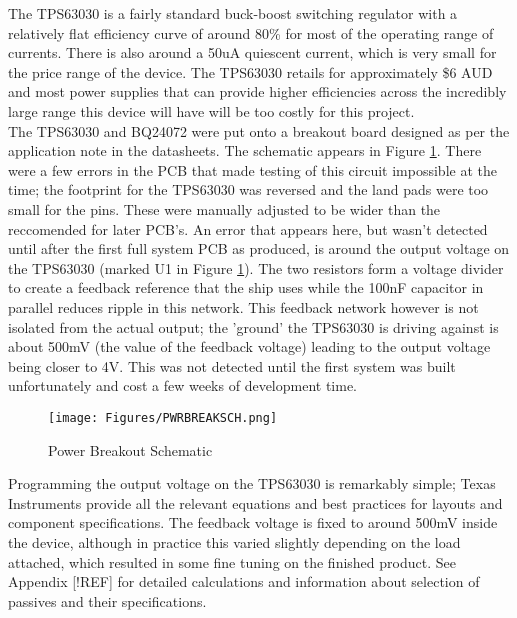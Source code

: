 \documentclass[12pt,openany,a4paper]{book}
\begin{document}
		The TPS63030 is a fairly standard buck-boost switching regulator with a relatively flat efficiency curve of around 80\% for most of the operating range of currents. There is also around a 50uA quiescent current, which is very small for the price range of the device. The TPS63030 retails for approximately \$6 AUD and most power supplies that can provide higher efficiencies across the incredibly large range this device will have will be too costly for this project. \\
		
		The TPS63030 and BQ24072 were put onto a breakout board designed as per the application note in the datasheets. The schematic appears in Figure \ref{fig:PWRBREAKSCH}. There were a few errors in the PCB that made testing of this circuit impossible at the time; the footprint for the TPS63030 was reversed and the land pads were too small for the pins. These were manually adjusted to be wider than the reccomended for later PCB's. An error that appears here, but wasn't detected until after the first full system PCB as produced, is around the output voltage on the TPS63030 (marked U1 in Figure \ref{fig:PWRBREAKSCH}). The two resistors form a voltage divider to create a feedback reference that the ship uses while the 100nF capacitor in parallel reduces ripple in this network. This feedback network however is not isolated from the actual output; the 'ground' the TPS63030 is driving against is about 500mV (the value of the feedback voltage) leading to the output voltage being closer to 4V. This was not detected until the first system was built unfortunately and cost a few weeks of development time. \\
		
		\begin{figure}[H]
			\centering
			\texttt{[image: Figures/PWRBREAKSCH.png]}
			\caption{Power Breakout Schematic}
			\label{fig:PWRBREAKSCH}
		\end{figure}	
		
		Programming the output voltage on the TPS63030 is remarkably simple; Texas Instruments provide all the relevant equations and best practices for layouts and component specifications. The feedback voltage is fixed to around 500mV inside the device, although in practice this varied slightly depending on the load attached, which resulted in some fine tuning on the finished product. See Appendix [!REF] for detailed calculations and information about selection of passives and their specifications.
		
\end{document}
